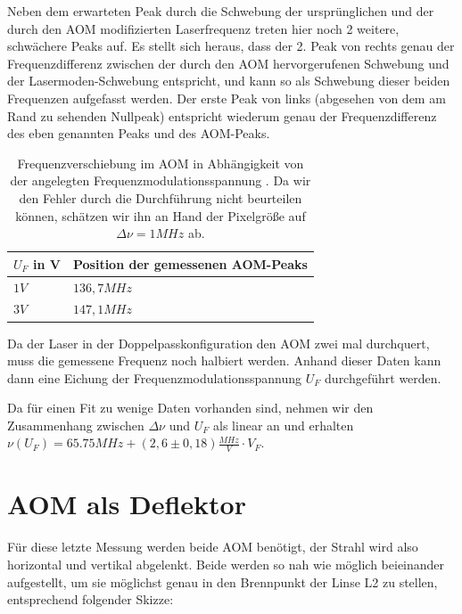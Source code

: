 \documentclass[bigchapter,colorback,accentcolor=tud4b,linedtoc,11pt]{tudreport}
\begin{document}
Neben dem erwarteten Peak durch die Schwebung der ursprünglichen und der durch den AOM modifizierten Laserfrequenz treten hier noch 2 weitere, schwächere Peaks auf. Es stellt sich heraus, dass der 2. Peak von rechts genau der Frequenzdifferenz zwischen der durch den AOM hervorgerufenen Schwebung und der Lasermoden-Schwebung entspricht, und kann so als Schwebung dieser beiden Frequenzen aufgefasst werden. Der erste Peak von links (abgesehen von dem am Rand zu sehenden Nullpeak) entspricht wiederum genau der Frequenzdifferenz des eben genannten Peaks und des AOM-Peaks.

\begin{table}[H]
  \begin{center}
    \begin{tabular}{|p{3cm}|p{6cm}|}
      \hline
          $U_F$ in V & Position der gemessenen AOM-Peaks \\ \hline
          $1V$       & $136,7 MHz$                       \\ \hline
          $3V$       & $147,1 MHz$                       \\ \hline
    \end{tabular}
  \end{center}
  \caption{Frequenzverschiebung im AOM in Abhängigkeit von der angelegten Frequenzmodulationsspannung \cite{AndereGruppe}. Da wir den Fehler durch die Durchführung nicht beurteilen können, schätzen wir ihn an Hand der Pixelgröße auf $\Delta \nu = 1 MHz$ ab.}
\end{table}

Da der Laser in der Doppelpasskonfiguration den AOM zwei mal durchquert, muss die gemessene Frequenz noch halbiert werden. Anhand dieser Daten kann dann eine Eichung der Frequenzmodulationsspannung $U_F$ durchgeführt werden. 

Da für einen Fit zu wenige Daten vorhanden sind, nehmen wir den Zusammenhang zwischen $\Delta \nu$ und $U_F$ als linear an und erhalten $\nu\left( U_F \right) = 65.75 MHz + \left( 2,6 \pm 0,18 \right)\frac{MHz}{V} \cdot V_F$.


\section{AOM als Deflektor}

Für diese letzte Messung werden beide AOM benötigt, der Strahl wird also horizontal und vertikal abgelenkt. Beide werden so nah wie möglich beieinander aufgestellt, um sie möglichst genau in den Brennpunkt der Linse L2 zu stellen, entsprechend folgender Skizze:
\end{document}

